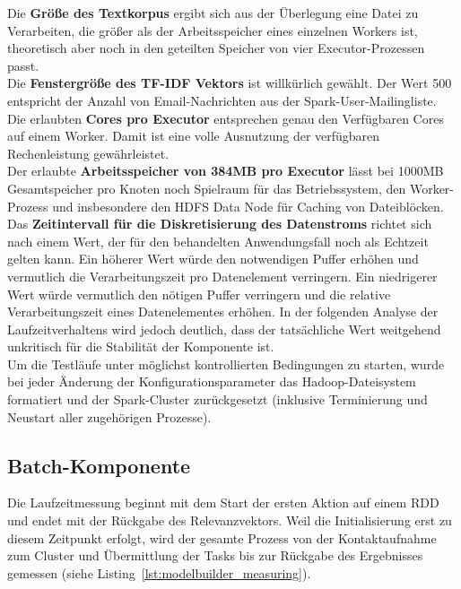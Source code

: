 Die \textbf{Größe des Textkorpus} ergibt sich aus der Überlegung eine Datei zu Verarbeiten, die größer als der Arbeitsspeicher eines einzelnen Workers ist, theoretisch aber noch in den geteilten Speicher von vier Executor-Prozessen passt.\\

Die \textbf{Fenstergröße des TF-IDF Vektors} ist willkürlich gewählt. Der Wert 500 entspricht der Anzahl von Email-Nachrichten aus der Spark-User-Mailingliste.\\

Die erlaubten \textbf{Cores pro Executor} entsprechen genau den Verfügbaren Cores auf einem Worker. Damit ist eine volle Ausnutzung der verfügbaren Rechenleistung gewährleistet.\\

Der erlaubte \textbf{Arbeitsspeicher von 384MB pro Executor} lässt bei 1000MB Gesamtspeicher pro Knoten noch Spielraum für das Betriebssystem, den Worker-Prozess und insbesondere den HDFS Data Node für Caching von Dateiblöcken.\\

Das \textbf{Zeitintervall für die Diskretisierung des Datenstroms} richtet sich nach einem Wert, der für den behandelten Anwendungsfall noch als Echtzeit gelten kann.
Ein höherer Wert würde den notwendigen Puffer erhöhen und vermutlich die Verarbeitungszeit pro Datenelement verringern. Ein niedrigerer Wert würde vermutlich den nötigen Puffer verringern und die relative Verarbeitungszeit eines Datenelementes erhöhen. In der folgenden Analyse der Laufzeitverhaltens wird jedoch deutlich, dass der tatsächliche Wert weitgehend unkritisch für die Stabilität der Komponente ist.\\

Um die Testläufe unter möglichst kontrollierten Bedingungen zu starten, wurde bei jeder Änderung der Konfigurationsparameter das Hadoop-Dateisystem formatiert und der Spark-Cluster zurückgesetzt (inklusive Terminierung und Neustart aller zugehörigen Prozesse).

\subsection{Batch-Komponente}

Die Laufzeitmessung beginnt mit dem Start der ersten Aktion auf einem \gls{RDD} und endet mit der Rückgabe des Relevanzvektors.
Weil die Initialisierung erst zu diesem Zeitpunkt erfolgt, wird der gesamte Prozess von der Kontaktaufnahme zum Cluster und Übermittlung der Tasks bis zur Rückgabe des Ergebnisses gemessen (siehe Listing~\ref{lst:modelbuilder_measuring}).\\

